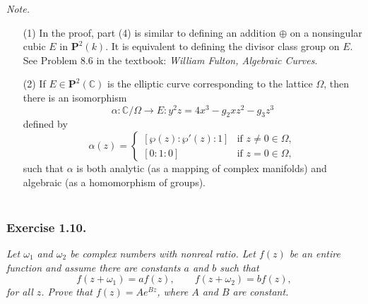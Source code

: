\documentclass{article}
\begin{document}
\emph{Note.}
\begin{enumerate}
\item[(1)]
  In the proof, part (4) is similar to defining an addition $\oplus$
  on a nonsingular cubic $E$ in $\mathbf{P}^2(k)$.
  It is equivalent to defining the divisor class group on $E$.
  See Problem 8.6 in the textbook: \emph{William Fulton, Algebraic Curves}.

\item[(2)]
  If $E \in \mathbf{P}^2(\mathbb{C})$ is the elliptic curve corresponding to the lattice $\Omega$,
  then there is an isomorphism
  \[
    \alpha: \mathbb{C}/\Omega \longrightarrow E: y^2 z = 4x^3 - g_2 xz^2 - g_3 z^3
  \]
  defined by
  \begin{equation*}
    \alpha(z) =
    \begin{cases}
       [\wp(z):\wp'(z):1] &\text{if $z \neq 0 \in \Omega$}, \\
       [0:1:0] &\text{if $z = 0 \in \Omega$},
    \end{cases}
  \end{equation*}
  such that $\alpha$ is both analytic (as a mapping of complex manifolds) and
  algebraic (as a homomorphism of groups). \\\\
\end{enumerate}






\subsubsection*{Exercise 1.10.}
\emph{Let $\omega_1$ and $\omega_2$ be complex numbers with nonreal ratio.
Let $f(z)$ be an entire function and assume there are constants $a$ and $b$ such that
\[
  f(z+\omega_1) = af(z), \qquad f(z+\omega_2) = bf(z),
\]
for all $z$.
Prove that $f(z) = A e^{Bz}$, where $A$ and $B$ are constant.} \\
\end{document}

